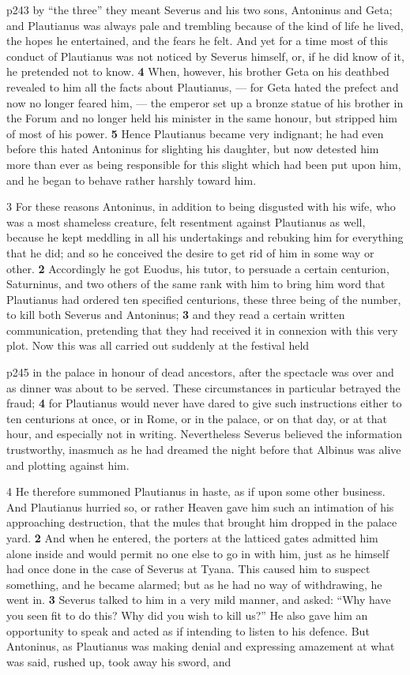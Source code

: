 p243 by ``the three'' they meant Severus and his two sons, Antoninus and Geta; and Plautianus was always pale and trembling because of the kind of life he lived, the hopes he entertained, and the fears he felt. And yet for a time most of this conduct of Plautianus was not noticed by Severus himself, or, if he did know of it, he pretended not to know. \textbf{4} When, however, his brother Geta on his deathbed revealed to him all the facts about Plautianus, \texthebrew{—} for Geta hated the prefect and now no longer feared him, \texthebrew{—} the emperor set up a bronze statue of his brother in the Forum and no longer held his minister in the same honour, but stripped him of most of his power. \textbf{5} Hence Plautianus became very indignant; he had even before this hated Antoninus for slighting his daughter, but now detested him more than ever as being responsible for this slight which had been put upon him, and he began to behave rather harshly toward him.

3 For these reasons Antoninus, in addition to being disgusted with his wife, who was a most shameless creature, felt resentment against Plautianus as well, because he kept meddling in all his undertakings and rebuking him for everything that he did; and so he conceived the desire to get rid of him in some way or other. \textbf{2} Accordingly he got Euodus, his tutor, to persuade a certain centurion, Saturninus, and two others of the same rank with him to bring him word that Plautianus had ordered ten specified centurions, these three being of the number, to kill both Severus and Antoninus; \textbf{3} and they read a certain written communication, pretending that they had received it in connexion with this very plot. Now this was all carried out suddenly at the festival held

p245 in the palace in honour of dead ancestors, after the spectacle was over and as dinner was about to be served. These circumstances in particular betrayed the fraud; \textbf{4} for Plautianus would never have dared to give such instructions either to ten centurions at once, or in Rome, or in the palace, or on that day, or at that hour, and especially not in writing. Nevertheless Severus believed the information trustworthy, inasmuch as he had dreamed the night before that Albinus was alive and plotting against him.

4 He therefore summoned Plautianus in haste, as if upon some other business. And Plautianus hurried so, or rather Heaven gave him such an intimation of his approaching destruction, that the mules that brought him dropped in the palace yard. \textbf{2} And when he entered, the porters at the latticed gates admitted him alone inside and would permit no one else to go in with him, just as he himself had once done in the case of Severus at Tyana. This caused him to suspect something, and he became alarmed; but as he had no way of withdrawing, he went in. \textbf{3} Severus talked to him in a very mild manner, and asked: ``Why have you seen fit to do this? Why did you wish to kill us?'' He also gave him an opportunity to speak and acted as if intending to listen to his defence. But Antoninus, as Plautianus was making denial and expressing amazement at what was said, rushed up, took away his sword, and

